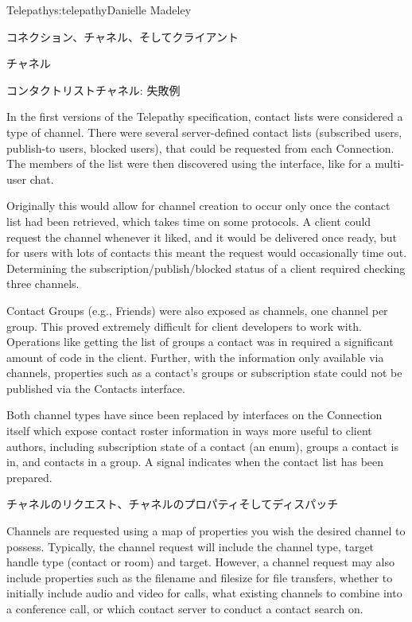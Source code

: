 \begin{aosachapter}{Telepathy}{s:telepathy}{Danielle Madeley}
\begin{aosasect1}{コネクション、チャネル、そしてクライアント}
\begin{aosasect2}{チャネル}
\begin{aosabox}{コンタクトリストチャネル: 失敗例}

In the first versions of the Telepathy specification, contact lists
were considered a type of channel. There were several server-defined
contact lists (subscribed users, publish-to users, blocked users),
that could be requested from each Connection. The members of the list
were then discovered using the  interface, like for a
multi-user chat.

Originally this would allow for channel creation to occur only once
the contact list had been retrieved, which takes time on some
protocols. A client could request the channel whenever it liked, and
it would be delivered once ready, but for users with lots of contacts
this meant the request would occasionally time out.  Determining the
subscription/publish/blocked status of a client required checking
three channels.

Contact Groups (e.g., Friends) were also exposed as channels, one
channel per group. This proved extremely difficult for client
developers to work with.  Operations like getting the list of groups a
contact was in required a significant amount of code in the client.
Further, with the information only available via channels, properties
such as a contact's groups or subscription state could not be
published via the Contacts interface.

Both channel types have since been replaced by interfaces on the
Connection itself which expose contact roster information in ways more
useful to client authors, including subscription state of a contact
(an enum), groups a contact is in, and contacts in a group.  A signal
indicates when the contact list has been prepared.

\end{aosabox}

\end{aosasect2}

\begin{aosasect2}{チャネルのリクエスト、チャネルのプロパティそしてディスパッチ}

Channels are requested using a map of properties you wish the desired
channel to possess. Typically, the channel request will include the
channel type, target handle type (contact or room) and target.
However, a channel request may also include properties such as the
filename and filesize for file transfers, whether to initially include
audio and video for calls, what existing channels to combine into a
conference call, or which contact server to conduct a contact search
on.


\end{aosasect2}
\end{aosasect1}
\end{aosachapter}
